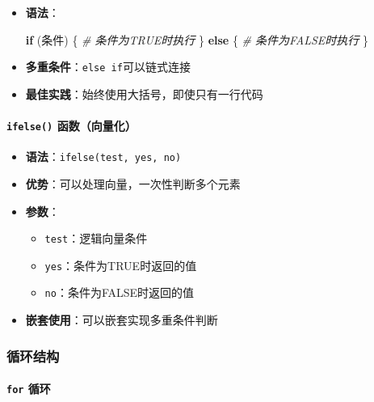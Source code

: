 \documentclass[
  twoside]{book}
\newenvironment{Shaded}{\begin{snugshade}}{\end{snugshade}}
\newcommand{\CommentTok}[1]{\textcolor[rgb]{0.56,0.35,0.01}{\textit{#1}}}
\newcommand{\ControlFlowTok}[1]{\textcolor[rgb]{0.13,0.29,0.53}{\textbf{#1}}}
\newcommand{\NormalTok}[1]{#1}
\providecommand{\tightlist}{%
  \setlength{\itemsep}{0pt}\setlength{\parskip}{0pt}}
\begin{document}
\begin{itemize}
\item
  \textbf{语法}：

\begin{Shaded}
\begin{Highlighting}[]
\ControlFlowTok{if}\NormalTok{ (条件) \{}
  \CommentTok{\# 条件为TRUE时执行}
\NormalTok{\} }\ControlFlowTok{else}\NormalTok{ \{}
  \CommentTok{\# 条件为FALSE时执行}
\NormalTok{\}}
\end{Highlighting}
\end{Shaded}
\item
  \textbf{多重条件}：\texttt{else\ if}可以链式连接
\item
  \textbf{最佳实践}：始终使用大括号，即使只有一行代码
\end{itemize}

\hypertarget{ifelse-ux51fdux6570ux5411ux91cfux5316}{%
\paragraph{\texorpdfstring{\texttt{ifelse()} 函数（向量化）}{ifelse() 函数（向量化）}}\label{ifelse-ux51fdux6570ux5411ux91cfux5316}}

\begin{itemize}
\tightlist
\item
  \textbf{语法}：\texttt{ifelse(test,\ yes,\ no)}
\item
  \textbf{优势}：可以处理向量，一次性判断多个元素
\item
  \textbf{参数}：

  \begin{itemize}
  \tightlist
  \item
    \texttt{test}：逻辑向量条件
  \item
    \texttt{yes}：条件为TRUE时返回的值
  \item
    \texttt{no}：条件为FALSE时返回的值
  \end{itemize}
\item
  \textbf{嵌套使用}：可以嵌套实现多重条件判断
\end{itemize}

\hypertarget{ux5faaux73afux7ed3ux6784}{%
\subsubsection{循环结构}\label{ux5faaux73afux7ed3ux6784}}

\hypertarget{for-ux5faaux73af}{%
\paragraph{\texorpdfstring{\texttt{for} 循环}{for 循环}}\label{for-ux5faaux73af}}
\end{document}
